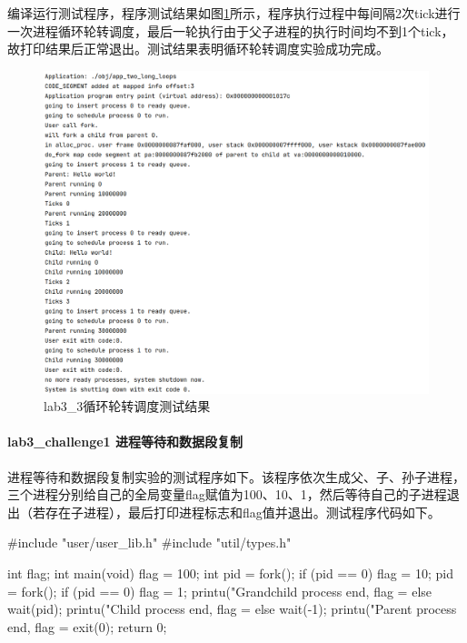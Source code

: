 编译运行测试程序，程序测试结果如图\ref{fig:lab3-3-testres}所示，程序执行过程中每间隔2次tick进行一次进程循环轮转调度，最后一轮执行由于父子进程的执行时间均不到1个tick，故打印结果后正常退出。测试结果表明循环轮转调度实验成功完成。
\begin{figure}[!htbp]
    \centering
    \includegraphics[width = 12cm]{figure/lab3_3_testresult.png}
    \caption{lab3_3循环轮转调度测试结果}
    \label{fig:lab3-3-testres}
\end{figure}

\paragraph{lab3_challenge1 进程等待和数据段复制}
进程等待和数据段复制实验的测试程序如下。该程序依次生成父、子、孙子进程，三个进程分别给自己的全局变量flag赋值为100、10、1，然后等待自己的子进程退出（若存在子进程），最后打印进程标志和flag值并退出。测试程序代码如下。
\begin{cppcode}
#include "user/user_lib.h"
#include "util/types.h"

int flag;
int main(void) {
    flag = 100;
    int pid = fork();
    if (pid == 0) {
        flag = 10;
        pid = fork();
        if (pid == 0) {
            flag = 1;
            printu("Grandchild process end, flag = %
        } else {
            wait(pid);
            printu("Child process end, flag = %
        }
    } else {
        wait(-1);
        printu("Parent process end, flag = %
    }
    exit(0);
    return 0;
}
\end{cppcode}

